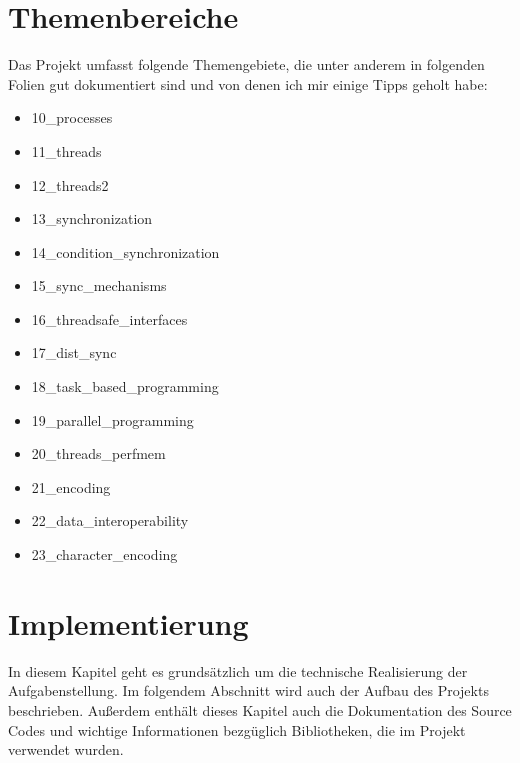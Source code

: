\documentclass[a4paper,12pt]{article}
\begin{document}
\section{Themenbereiche}
Das Projekt umfasst folgende Themengebiete, die unter anderem in folgenden Folien gut dokumentiert sind und von denen ich mir einige Tipps geholt habe:
    \begin{itemize}
        \item  10\_processes
        \item  11\_threads
        \item  12\_threads2 
        \item  13\_synchronization 
        \item  14\_condition\_synchronization 
        \item  15\_sync\_mechanisms 
        \item  16\_threadsafe\_interfaces 
        \item  17\_dist\_sync 
        \item  18\_task\_based\_programming 
        \item  19\_parallel\_programming 
        \item  20\_threads\_perfmem
        \item  21\_encoding
        \item  22\_data\_interoperability
        \item  23\_character\_encoding
    \end{itemize} 
\newpage
\section{Implementierung}
In diesem Kapitel geht es grundsätzlich um die technische Realisierung der Aufgabenstellung. Im folgendem Abschnitt wird auch
der Aufbau des Projekts beschrieben. Außerdem enthält dieses Kapitel auch die Dokumentation des Source Codes und wichtige Informationen bezgüglich Bibliotheken, 
die im Projekt verwendet wurden. 
\end{document}
